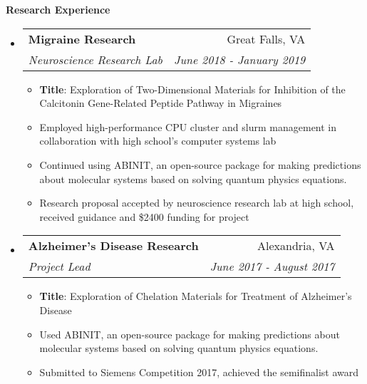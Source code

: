 \documentclass[letterpaper,10pt]{article}
\makeatletter
\newcommand{\resitem}[1]{\item #1 \vspace{-2pt}}
\newcommand{\resheading}[1]{{\large \colorbox{mygrey}{\begin{minipage}{\textwidth}{\textbf{#1 \vphantom{p\^{E}}}}\end{minipage}}}}
\newcommand{\ressubheading}[4]{
\begin{tabular*}{7.0in}{l@{\extracolsep{\fill}}r}
		\textbf{#1} & #2 \\
		\textit{#3} & \textit{#4} \\
\end{tabular*}\vspace{-6pt}}
\makeatother
\begin{document}
\resheading{Research Experience}
\begin{itemize}
\item
	\ressubheading{Migraine Research}{Great Falls, VA}{Neuroscience Research Lab}{June 2018 - January 2019}
	\begin{itemize}
		\resitem{\textbf{Title}: Exploration of Two-Dimensional Materials for Inhibition of the Calcitonin Gene-Related Peptide Pathway in Migraines}
	    \resitem{Employed high-performance CPU cluster and slurm management in collaboration with high school's computer systems lab}
	    \resitem{Continued using ABINIT, an open-source package for making predictions about molecular systems based on solving quantum physics equations.}
	    \resitem{Research proposal accepted by neuroscience research lab at high school, received guidance and \$2400 funding for project}
	\end{itemize}
\item
	\ressubheading{Alzheimer's Disease Research}{Alexandria, VA}{Project Lead}{June 2017 - August 2017}
	\begin{itemize}
	    \resitem{\textbf{Title}: Exploration of Chelation Materials for Treatment of Alzheimer's Disease}
		\resitem{Used ABINIT, an open-source package for making predictions about molecular systems based on solving quantum physics equations.}
		\resitem{Submitted to Siemens Competition 2017, achieved the semifinalist award}

\end{itemize}
\end{itemize}
\end{document}
